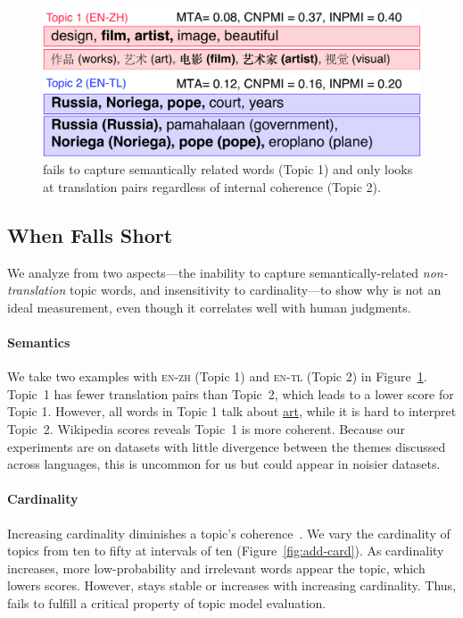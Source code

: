 \begin{figure}[t]
	\centering
	\includegraphics[width=\linewidth]{2018_naacl_mltm_eval/figures/mta_fail_example}
	\caption{\mta{} fails to capture semantically related words
          (Topic 1) and only looks at translation pairs regardless of
          internal coherence (Topic 2).}
	\label{fig:mtafailexample}
\end{figure}



\subsection{When \mta{} Falls Short}

We analyze \mta{} from two aspects---the inability to
capture semantically-related \textit{non-translation} topic words, and
insensitivity to cardinality---to show why \mta{} is not an ideal
measurement, even though it correlates well with human judgments.

\paragraph{Semantics}
We take two examples with \textsc{en-zh} (Topic 1) and \textsc{en-tl}
(Topic 2) in Figure~\ref{fig:mtafailexample}. Topic~1 has fewer
translation pairs than Topic~2, which leads to a lower \mta{} score
for Topic 1. However, all words in Topic 1 talk about \underline{art},
while it is hard to interpret Topic~2.  Wikipedia 
\cnpmi{} scores reveals Topic~1 is more coherent.  Because
our experiments are on datasets with little divergence between the
themes discussed across languages, this is uncommon for us but could
appear in noisier datasets.

\paragraph{Cardinality}  Increasing cardinality diminishes a topic's coherence~\cite{JHL16}.
We vary the cardinality of topics from ten to fifty at intervals of
ten (Figure~\ref{fig:add-card}).  As cardinality increases, more
low-probability and irrelevant words appear the topic, which lowers
\cnpmi{} scores.  However, \mta{} stays stable or increases with
increasing cardinality.  Thus, \mta{} fails to fulfill a critical
property of topic model evaluation.

